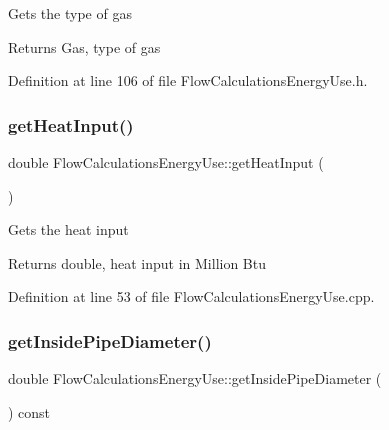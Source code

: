 Gets the type of gas

\begin{DoxyReturn}{Returns}
Gas, type of gas 
\end{DoxyReturn}


Definition at line 106 of file Flow\+Calculations\+Energy\+Use.\+h.

\mbox{\label{class_flow_calculations_energy_use_af2d2196911d4784d72b14dff83295b19}} 
\subsubsection{\texorpdfstring{get\+Heat\+Input()}{getHeatInput()}}
{\footnotesize\ttfamily double Flow\+Calculations\+Energy\+Use\+::get\+Heat\+Input (\begin{DoxyParamCaption}{ }\end{DoxyParamCaption})}

Gets the heat input

\begin{DoxyReturn}{Returns}
double, heat input in Million Btu 
\end{DoxyReturn}


Definition at line 53 of file Flow\+Calculations\+Energy\+Use.\+cpp.

\mbox{\label{class_flow_calculations_energy_use_a9042dce2938208358fe38ed8a726ca65}} 
\subsubsection{\texorpdfstring{get\+Inside\+Pipe\+Diameter()}{getInsidePipeDiameter()}}
{\footnotesize\ttfamily double Flow\+Calculations\+Energy\+Use\+::get\+Inside\+Pipe\+Diameter (\begin{DoxyParamCaption}{ }\end{DoxyParamCaption}) const\hspace{0.3cm}{\ttfamily [inline]}}

